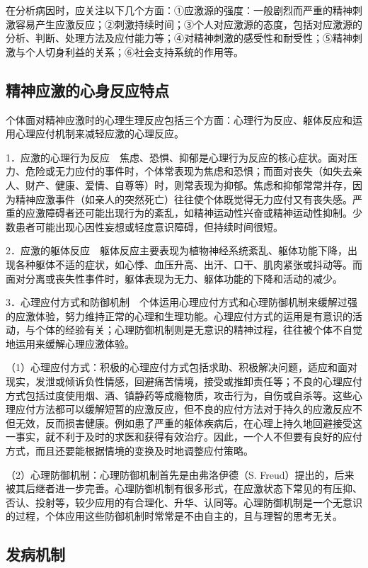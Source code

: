 在分析病因时，应关注以下几个方面：①应激源的强度：一般剧烈而严重的精神刺激容易产生应激反应；②刺激持续时间；③个人对应激源的态度，包括对应激源的分析、判断、处理方法及应付能力等；④对精神刺激的感受性和耐受性；⑤精神刺激与个人切身利益的关系；⑥社会支持系统的作用等。

\subsection{精神应激的心身反应特点}

个体面对精神应激时的心理生理反应包括三个方面：心理行为反应、躯体反应和运用心理应付机制来减轻应激的心理反应。

1．应激的心理行为反应　焦虑、恐惧、抑郁是心理行为反应的核心症状。面对压力、危险或无力应付的事件时，个体常表现为焦虑和恐惧；而面对丧失（如失去亲人、财产、健康、爱情、自尊等）时，则常表现为抑郁。焦虑和抑郁常常并存，因为精神应激事件（如亲人的突然死亡）往往使个体既觉得无力应付又有丧失感。严重的应激障碍者还可能出现行为的紊乱，如精神运动性兴奋或精神运动性抑制。少数患者可能出现心因性妄想或轻度意识障碍，但持续时间很短。

2．应激的躯体反应　躯体反应主要表现为植物神经系统紊乱、躯体功能下降，出现各种躯体不适的症状，如心悸、血压升高、出汗、口干、肌肉紧张或抖动等。而面对分离或丧失性事件时，躯体表现为无力、躯体功能的下降和活动的减少。

3．心理应付方式和防御机制　个体运用心理应付方式和心理防御机制来缓解过强的应激体验，努力维持正常的心理和生理功能。心理应付方式的运用是有意识的活动，与个体的经验有关；心理防御机制则是无意识的精神过程，往往被个体不自觉地运用来缓解心理应激体验。

（1）心理应付方式：积极的心理应付方式包括求助、积极解决问题，适应和面对现实，发泄或倾诉负性情感，回避痛苦情境，接受或推卸责任等；不良的心理应付方式包括过度使用烟、酒、镇静药等成瘾物质，攻击行为，自伤或自杀等。这些心理应付方法都可以缓解短暂的应激反应，但不良的应付方法对于持久的应激反应不但无效，反而损害健康。例如患了严重的躯体疾病后，在心理上持久地回避接受这一事实，就不利于及时的求医和获得有效治疗。因此，一个人不但要有良好的应付方式，而且还要能根据情境的变换及时地调整应付策略。

（2）心理防御机制：心理防御机制首先是由弗洛伊德（S.
Freud）提出的，后来被其后继者进一步完善。心理防御机制有很多形式，在应激状态下常见的有压抑、否认、投射等，较少应用的有合理化、升华、认同等。心理防御机制是一个无意识的过程，个体应用这些防御机制时常常是不由自主的，且与理智的思考无关。

\subsection{发病机制}


